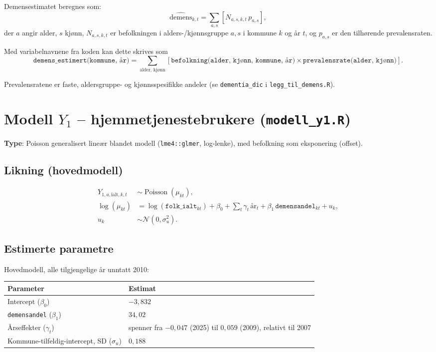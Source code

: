 \documentclass[11pt,a4paper]{article}
\begin{document}
Demensestimatet beregnes som:
\[
\widehat{\text{demens}}_{k,t}
=
\sum_{a,s}
\left[
N_{a,s,k,t}\,
p_{a,s}
\right],
\]
der \(a\) angir alder, \(s\) kjønn, \(N_{a,s,k,t}\) er befolkningen i
alders-/kjønnsgruppe \(a,s\) i kommune \(k\) og år \(t\), og \(p_{a,s}\)
er den tilhørende prevalensraten.

Med variabelnavnene fra koden kan dette skrives som
\[
\texttt{demens\_estimert(kommune, år)}
=
\sum_{\text{alder, kjønn}}
\left[
\texttt{befolkning(alder, kjønn, kommune, år)}
\times
\texttt{prevalensrate(alder, kjønn)}
\right].
\]

Prevalensratene er faste, aldersgruppe- og kjønnsspesifikke andeler
(se \texttt{dementia\_dic} i \texttt{legg\_til\_demens.R}).

\section{Modell \(Y_1\) -- hjemmetjenestebrukere
(\texttt{modell\_y1.R})}

\textbf{Type}: Poisson generalisert lineær blandet modell
(\texttt{lme4::glmer}, log-lenke), med befolkning som eksponering
(offset).

\subsection*{Likning (hovedmodell)}

\begin{align}
Y_{1,a,\mathrm{ialt},k,t}
&\sim \operatorname{Poisson}(\mu_{kt}), \\
\log(\mu_{kt})
&=
\log(\texttt{folk\_ialt}_{kt})
+\beta_0
+\sum_t \gamma_t\,\text{år}_t
+\beta_1\,\texttt{demensandel}_{kt}
+u_k, \\
u_k &\sim \mathcal{N}(0,\sigma_u^2).
\end{align}

\subsection*{Estimerte parametre}

Hovedmodell, alle tilgjengelige år unntatt 2010:

\begin{table}[htbp]
\centering
\begin{tabularx}{0.9\textwidth}{>{\raggedright\arraybackslash}X >{\raggedright\arraybackslash}p{5.2cm}}
\toprule
\textbf{Parameter} & \textbf{Estimat} \\
\midrule
Intercept (\(\beta_0\)) & \(-3{,}832\) \\
\texttt{demensandel} (\(\beta_1\)) & \(34{,}02\) \\
Årseffekter (\(\gamma_t\)) &
spenner fra \(-0{,}047\) (2025) til \(0{,}059\) (2009), relativt til 2007 \\
Kommune-tilfeldig-intercept, SD (\(\sigma_u\)) & \(0{,}188\) \\
\bottomrule
\end{tabularx}
\end{table}
\end{document}
